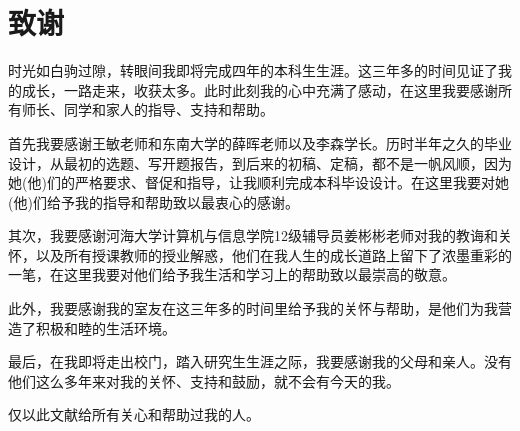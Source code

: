 \chapter*{致\hspace{1cm}谢}
时光如白驹过隙，转眼间我即将完成四年的本科生生涯。这三年多的时间见证了我的成长，一路走来，收获太多。此时此刻我的心中充满了感动，在这里我要感谢所有师长、同学和家人的指导、支持和帮助。

首先我要感谢王敏老师和东南大学的薛晖老师以及李森学长。历时半年之久的毕业设计，从最初的选题、写开题报告，到后来的初稿、定稿，都不是一帆风顺，因为她(他)们的严格要求、督促和指导，让我顺利完成本科毕设设计。在这里我要对她(他)们给予我的指导和帮助致以最衷心的感谢。

其次，我要感谢河海大学计算机与信息学院12级辅导员姜彬彬老师对我的教诲和关怀，以及所有授课教师的授业解惑，他们在我人生的成长道路上留下了浓墨重彩的一笔，在这里我要对他们给予我生活和学习上的帮助致以最崇高的敬意。

此外，我要感谢我的室友在这三年多的时间里给予我的关怀与帮助，是他们为我营造了积极和睦的生活环境。

最后，在我即将走出校门，踏入研究生生涯之际，我要感谢我的父母和亲人。没有他们这么多年来对我的关怀、支持和鼓励，就不会有今天的我。

仅以此文献给所有关心和帮助过我的人。